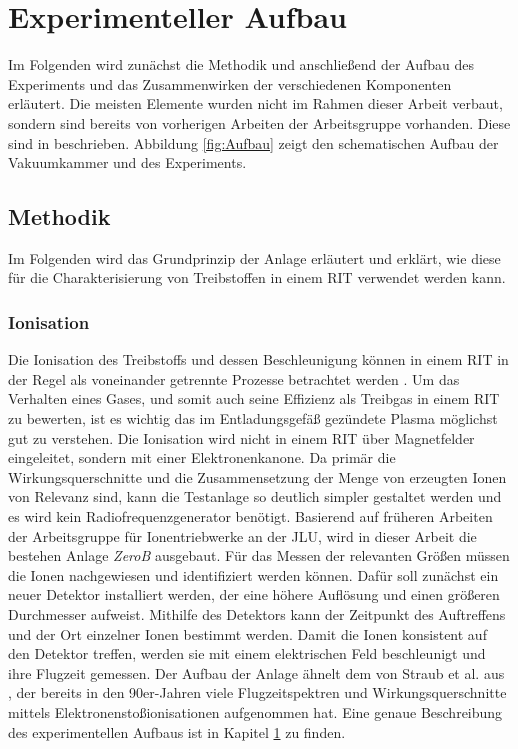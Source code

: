\chapter{Experimenteller Aufbau}
\label{chap:Aufbau}
Im Folgenden wird zunächst die Methodik und anschließend der Aufbau des Experiments und das Zusammenwirken der verschiedenen Komponenten erläutert. Die meisten Elemente wurden nicht im Rahmen dieser Arbeit verbaut, sondern sind bereits von vorherigen Arbeiten der Arbeitsgruppe vorhanden. Diese sind in \cite{Holzte} beschrieben. Abbildung \ref{fig:Aufbau} zeigt den schematischen Aufbau der Vakuumkammer und des Experiments.

\section{Methodik}
Im Folgenden wird das Grundprinzip der Anlage erläutert und erklärt, wie diese für die Charakterisierung von Treibstoffen in einem RIT verwendet werden kann.

\subsection{Ionisation} 
Die Ionisation des Treibstoffs und dessen Beschleunigung können in einem RIT in der Regel als voneinander getrennte Prozesse betrachtet werden \cite{ion}. Um das Verhalten eines Gases, und somit auch seine Effizienz als Treibgas in einem RIT zu bewerten, ist es wichtig das im Entladungsgefäß gezündete Plasma möglichst gut zu verstehen. Die Ionisation wird nicht in einem RIT über Magnetfelder eingeleitet, sondern mit einer Elektronenkanone. Da primär die Wirkungsquerschnitte und die Zusammensetzung der Menge von erzeugten Ionen von Relevanz sind, kann die Testanlage so deutlich simpler gestaltet werden und es wird kein Radiofrequenzgenerator benötigt. Basierend auf früheren Arbeiten der Arbeitsgruppe für Ionentriebwerke an der JLU, wird in dieser Arbeit die bestehen Anlage \textit{ZeroB} ausgebaut. Für das Messen der relevanten Größen müssen die Ionen nachgewiesen und identifiziert werden können. Dafür soll zunächst ein neuer Detektor installiert werden, der eine höhere Auflösung und einen größeren Durchmesser aufweist. Mithilfe des Detektors kann der Zeitpunkt des Auftreffens und der Ort einzelner Ionen bestimmt werden. Damit die Ionen konsistent auf den Detektor treffen, werden sie mit einem elektrischen Feld beschleunigt und ihre Flugzeit gemessen. Der Aufbau der Anlage ähnelt dem von Straub et al. aus \cite{Straub}, der bereits in den 90er-Jahren viele Flugzeitspektren und Wirkungsquerschnitte mittels Elektronenstoßionisationen aufgenommen hat. Eine genaue Beschreibung des experimentellen Aufbaus ist in Kapitel \ref{chap:Aufbau} zu finden.

